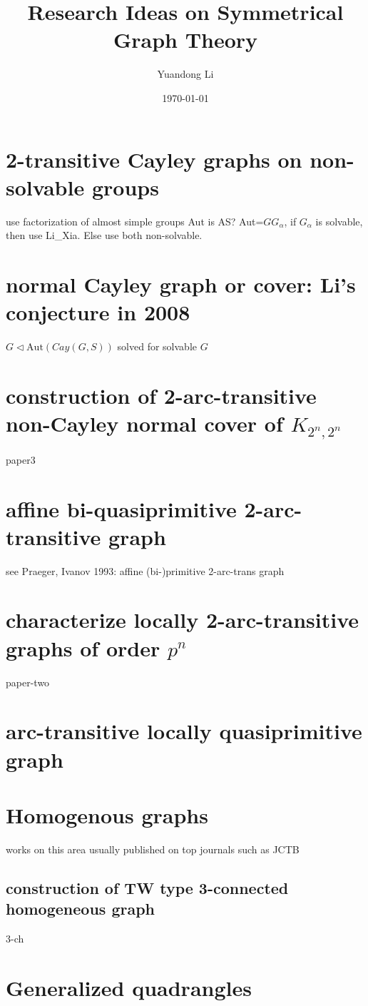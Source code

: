 \documentclass[a4,11pt]{article}
\title{Research Ideas on Symmetrical Graph Theory}
\author{Yuandong Li}
\date{\today}
\begin{document}
\maketitle

\tableofcontents
\newpage


\section{2-transitive Cayley graphs on non-solvable groups}
use factorization of almost simple groups
Aut is AS?
Aut=$G G_\alpha$, if $G_\alpha$ is solvable, then use Li_Xia. Else use both non-solvable.


\section{normal Cayley graph or cover: Li's conjecture in 2008}
$G\triangleleft \mathrm{Aut}(Cay(G,S))$
solved for solvable $G$

\section{construction of 2-arc-transitive non-Cayley normal cover of $K_{2^n,2^n}$}
paper3

\section{affine bi-quasiprimitive 2-arc-transitive graph}
see Praeger, Ivanov 1993: affine (bi-)primitive 2-arc-trans graph

\section{characterize locally 2-arc-transitive graphs of order $p^n$}
paper-two

\section{arc-transitive locally quasiprimitive graph}


\section{Homogenous graphs}
works on this area usually published on top journals such as JCTB
\subsection{construction of TW type 3-connected homogeneous graph}
3-ch


\section{Generalized quadrangles}
\end{document}
